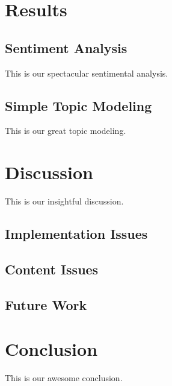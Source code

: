 \documentclass[10pt,a4paper,twocolumn]{scrartcl}
\begin{document}

%

\section{Results}

\subsection{Sentiment Analysis}
This is our spectacular sentimental analysis.

\subsection{Simple Topic Modeling}
This is our great topic modeling.

\section{Discussion}
This is our insightful discussion.
\subsection{Implementation Issues}

\subsection{Content Issues}

\subsection{Future Work}

\section{Conclusion}
This is our awesome conclusion.
\end{document}
